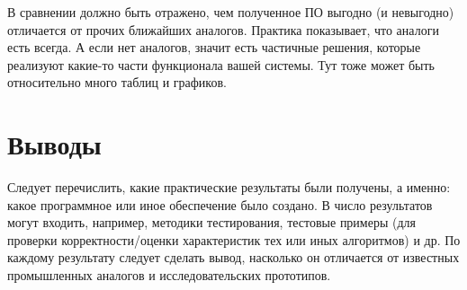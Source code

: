 В сравнении должно быть отражено, чем полученное ПО выгодно (и невыгодно) отличается от прочих ближайших аналогов. Практика показывает, что аналоги есть всегда. А если нет аналогов, значит есть частичные решения, которые реализуют какие-то части функционала вашей системы. Тут тоже может быть относительно много таблиц и графиков.



\section{Выводы}

Следует перечислить, какие практические результаты были получены, а именно: какое программное или иное обеспечение было создано. В число результатов могут входить, например, методики тестирования, тестовые примеры (для проверки корректности/оценки характеристик тех или иных алгоритмов) и др. По каждому результату следует сделать вывод, насколько он отличается от известных промышленных аналогов и исследовательских прототипов.

